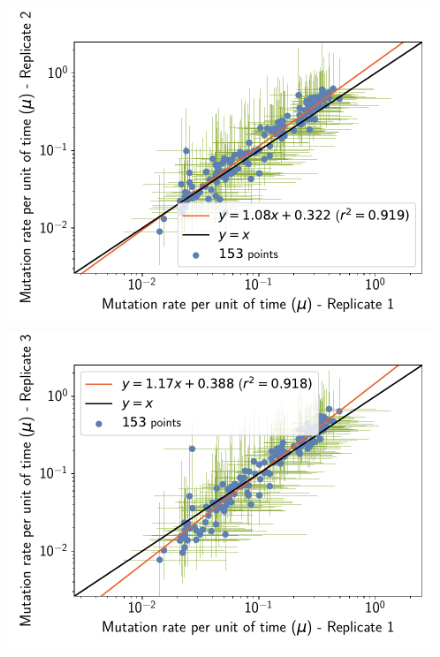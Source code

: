 \documentclass{article}
\begin{document}
	\begin{figure}[H]
		\centering
		\begin{minipage}{0.32\linewidth}
			\includegraphics[width=\linewidth, page=1]{mammals/18CDS_SiteMutSelBranchNe_Rep_LogMutationRatePerTime-1-2}
		\end{minipage} \hfill
		\begin{minipage}{0.32\linewidth}
			\includegraphics[width=\linewidth, page=1]{mammals/18CDS_SiteMutSelBranchNe_Rep_LogMutationRatePerTime-1-3}
		\end{minipage} \hfill
		\begin{minipage}{0.32\linewidth}

\end{minipage}
\end{figure}
\end{document}
